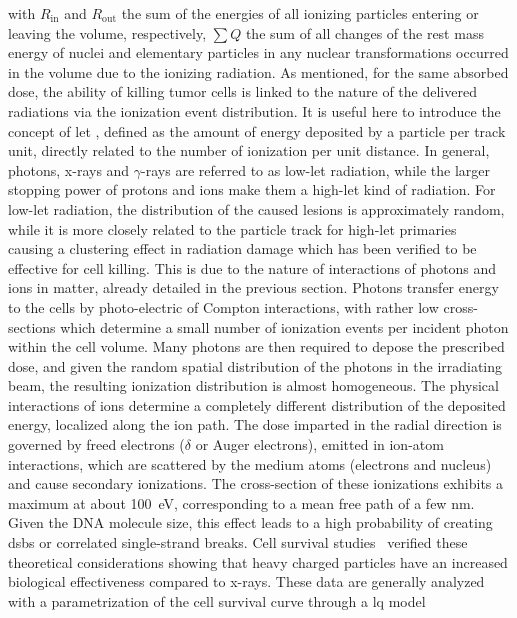 with $R_{\mathrm{in}}$ and $R_{\mathrm{out}}$ the sum of the energies of all ionizing particles entering or leaving the volume, respectively, $ \sum{Q}$ the sum of all changes of the rest mass energy of nuclei and elementary particles in any nuclear transformations occurred in the volume due to the ionizing radiation.
As mentioned, for the same absorbed dose, the ability of killing tumor cells is linked to the nature of the delivered radiations via the ionization event distribution. It is useful here to introduce the concept of \gls{let} , defined as the amount of energy deposited by a particle per track unit, directly related to the number of ionization per unit distance. In general, photons, x-rays and $\gamma$-rays are referred to as low-\gls{let} radiation, while the larger stopping power of protons and ions make them a high-\gls{let} kind of radiation. For low-\gls{let} radiation, the distribution of the caused lesions is approximately random, while it is more closely related to the particle track for high-\gls{let} primaries~\parencite{Lobrich1996} causing a clustering effect in radiation damage which has been verified to be effective for cell killing\parencite{Holley1996, Rydberg1996}. This is due to the nature of interactions of photons and ions in matter, already detailed in the previous section. 
Photons transfer energy to the cells by photo-electric of Compton interactions, with rather low cross-sections which determine a small number of ionization events per incident photon within the cell volume. Many photons are then required to depose the prescribed dose, and given the random spatial distribution of the photons in the irradiating beam, the resulting ionization distribution is almost homogeneous. The physical interactions of ions determine a completely different distribution of the deposited energy, localized along the ion path. The dose imparted in the radial direction is governed by freed electrons ($\delta$ or Auger electrons), emitted in ion-atom interactions, which are scattered by the medium atoms (electrons and nucleus) and cause secondary ionizations. The cross-section of these ionizations exhibits a maximum at about 100~eV, corresponding to a mean free path of a few nm. Given the DNA molecule size, this effect leads to a high probability of creating \glspl{dsb} or correlated single-strand breaks. %
Cell survival studies~\parencite{Tobias1982, Blakely1984} verified these theoretical considerations showing that heavy charged particles have an increased biological effectiveness compared to x-rays. These data are generally analyzed with a parametrization of the cell survival curve through a \gls{lq} model~\parencite{Hall2012}

